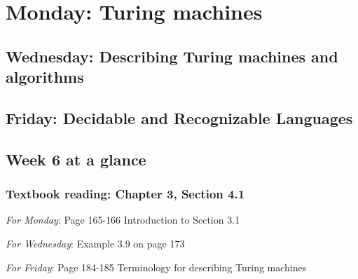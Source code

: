 

\section*{Monday: Turing machines}


    
\newpage
\subsection*{Wednesday: Describing Turing machines and algorithms}




\newpage
\subsection*{Friday: Decidable and Recognizable Languages}



\newpage

\subsection*{Week 6 at a glance}

\subsubsection*{Textbook reading: Chapter 3, Section 4.1}

{\it For Monday}: Page 165-166 Introduction to Section 3.1

{\it For Wednesday}: Example 3.9 on page 173

{\it For Friday}:  Page 184-185 Terminology for describing Turing machines



